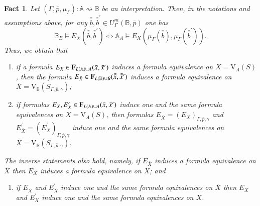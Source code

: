 \documentclass[12pt]{article}
\newtheorem{fact}{Fact}
\theoremstyle{definition}
\def\MA{{\mathbb{A}}}
\def\MB{{\mathbb{B}}}
\def\V{{\mathrm{V}}}
\begin{document}
\begin{fact}\label{fact1.5}
Let $(\Gamma,\bar p,\mu_\Gamma)\colon\MA\rightsquigarrow\MB$ be an interpretation. Then, in the notations and assumptions above, 
for any $\bar {\bar b}, \bar {\bar b}^\prime\in U^m_\Gamma(\MB,\bar p)$ one has
\begin{equation}\label{eq:sim}
\MB_B\models E_{\bar X}(\bar {\bar b},\bar {\bar b}^\prime) \iff \MA_A\models E_X(\mu_\Gamma(\bar {\bar b }),\mu_\Gamma(\bar {\bar b}^\prime)).
\end{equation}
Thus, we obtain that
\begin{enumerate}[label=(F\arabic*)]\addtocounter{enumi}{2}
    \item\label{F3} if a formula $E_X\in {\bf F}_{L(\MA)\cup A}(\bar x,\bar x^\prime)$ induces a formula equivalence on $X=\V_A(S)$, then the formula $E_{\bar X}\in {\bf F}_{L(\MB)\cup B}(\bar {\bar x},\bar {\bar x}^\prime)$ induces a formula equivalence on $\bar X=\V_\MB(S_{\Gamma,\bar p,\gamma})$;
    \item\label{F4} if formulas $E_X,E^\prime_X\in {\bf F}_{L(\MA)\cup A}(\bar x,\bar x^\prime)$ induce one and the same formula equivalences  on $X=\V_A(S)$, then formulas $E_{\bar X}=(E_X)_{\Gamma, \bar p, \gamma}$ and $E^\prime_{\bar X}=(E^\prime_X)_{\Gamma, \bar p, \gamma}$ induce one and the same formula equivalences  on $\bar X=\V_\MB(S_{\Gamma,\bar p,\gamma})$.
\end{enumerate}
The inverse statements also hold, namely, if $E_{\bar X}$ induces a formula equivalence on $\bar X$ then $E_X$ induces a formula equivalence on $X$; and 
\begin{enumerate}[label=(E\arabic*)]\addtocounter{enumi}{1}
    \item\label{E2} if $E_{\bar X}$ and $E^\prime_{\bar X}$ induce one and the same formula equivalences on $\bar X$ then $E_X$ and $E_X^\prime$ induce one and the same formula equivalences on $X$.
\end{enumerate}
\end{fact}
\end{document}
